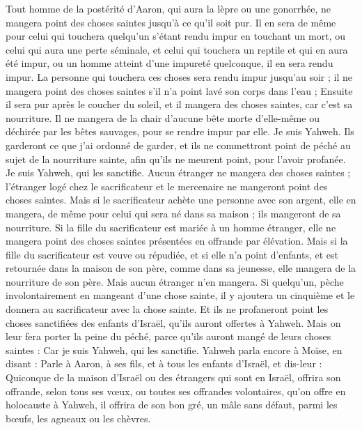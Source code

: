 \begin{multicols}{2}
Tout homme de la postérité d'Aaron, qui aura la lèpre ou une gonorrhée, ne mangera point des choses saintes jusqu'à ce qu'il soit pur. Il en sera de même pour celui qui touchera quelqu'un s'étant rendu impur en touchant un mort, ou celui qui aura une perte séminale,
et celui qui touchera un reptile et qui en aura été impur, ou un homme atteint d'une impureté quelconque, il en sera rendu impur.
La personne qui touchera ces choses sera rendu impur jusqu'au soir ; il ne mangera point des choses saintes s'il n'a point lavé son corps dans l'eau ;
Ensuite il sera pur après le coucher du soleil, et il mangera des choses saintes, car c'est sa nourriture.
Il ne mangera de la chair d'aucune bête morte d'elle-même ou déchirée  par les bêtes sauvages, pour se rendre impur par elle. Je suis Yahweh.
Ils garderont ce que j'ai ordonné de garder, et ils ne commettront point de péché au sujet de la nourriture sainte, afin qu'ils ne meurent point, pour l'avoir profanée. Je suis Yahweh, qui les sanctifie.
Aucun étranger ne mangera des choses saintes ; l'étranger logé chez le sacrificateur et le mercenaire ne mangeront point des choses saintes.
Mais si le sacrificateur achète une personne avec son argent, elle en mangera, de même pour celui qui sera né dans sa maison ; ils mangeront de sa nourriture.
Si la fille du sacrificateur est mariée à un homme étranger, elle ne mangera point des choses saintes présentées en offrande par élévation.
Mais si la fille du sacrificateur est veuve ou répudiée, et si elle n'a point d'enfants, et est retournée dans la maison de son père, comme dans sa jeunesse, elle mangera de la nourriture de son père. Mais aucun étranger n'en mangera.
Si quelqu'un, pèche involontairement en mangeant d'une chose sainte, il y ajoutera un cinquième et le donnera au sacrificateur avec la chose sainte.
Et ils ne profaneront point les choses sanctifiées des enfants d'Israël, qu'ils auront offertes à Yahweh.
Mais on leur fera porter la peine du péché, parce qu'ils auront mangé de leurs choses saintes : Car je suis Yahweh, qui les sanctifie.
Yahweh parla encore à Moïse, en disant :
Parle à Aaron, à ses fils, et à tous les enfants d'Israël, et dis-leur : Quiconque de la maison d'Israël ou des étrangers qui sont en Israël, offrira son offrande, selon tous ses vœux, ou toutes ses offrandes volontaires, qu'on offre en holocauste à Yahweh,
il offrira de son bon gré, un mâle sans défaut, parmi les bœufs, les agneaux ou les chèvres.

\end{multicols}
